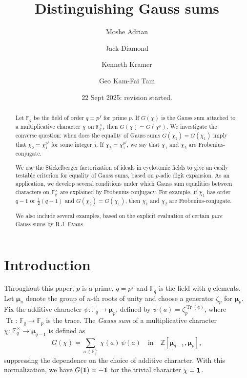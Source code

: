 \documentclass[12pt]{amsart}  \usepackage{amsmath,amssymb,enumerate,amscd,tikz,url}
\title{Distinguishing Gauss sums}
\author[M. Adrian]{Moshe Adrian}
\author[J. Diamond]{Jack Diamond}
\author[K. Kramer]{Kenneth Kramer}
\author[G. K.-F. Tam]{Geo Kam-Fai Tam}
\date{22 Sept 2025:  revision started.}
\numberwithin{equation}{section}
\theoremstyle{definition}
\newcommand{\F}{{\mathbb F}}
\newcommand{\Z}{{\mathbb Z}}
\newcommand{\Mu}{\boldsymbol \mu}
\newcommand{\Tr}{\operatorname{Tr}}
\begin{document}
\baselineskip=17pt

\begin{abstract}
Let $\F_q$ be the field of order $q = p^f$ for prime $p$. If $G(\chi)$ is the Gauss sum attached to a multiplicative character $\chi$ on $\F_q^\times$, then $G(\chi) = G(\chi^p)$.  We investigate the converse question:  when does the equality of Gauss sums $G(\chi_2) = G(\chi_1)$ imply that $\chi_2 = \chi_1^{p^j}$ for some integer $j$.  If $\chi_2 = \chi_1^{p^j}$, we say that $\chi_1$ and $\chi_2$ are Frobenius-conjugate.

We use the Stickelberger factorization of ideals in cyclotomic fields to give an easily testable criterion for equality of Gauss sums, based on $p$-adic digit expansion.  As an application, we develop several conditions under which Gauss sum equalities between characters on $\F_q^\times$ are explained by Frobenius-conjugacy.  For example, if $\chi_1$ has order $q-1$ or $\frac{1}{2}(q-1)$ and $G(\chi_2) = G(\chi_1)$, then $\chi_1$ and $\chi_2$ are Frobenius-conjugate.

We also include several examples, based on the explicit evaluation of certain {\em pure} Gauss sums by R.J. Evans.
\end{abstract}

\maketitle
\tableofcontents


\keywords{}


\section{Introduction}

Throughout this paper, $p$ is a prime, $q = p^f$ and $\mathbb{F}_q$ is the field with $q$ elements.   Let $\Mu_n$ denote the group of $n$-th roots of unity and choose a generator $\zeta_p$ for $\Mu_p$. Fix the additive character $\psi\!: \F_q \to \Mu_p$, defined by $\psi(a) = \zeta_p^{\Tr(a)}$, where $\Tr\!: \, \F_q \to \F_p$ is the trace.  The {\em Gauss sum} of a multiplicative character  $\chi\!: \, \F_q^\times \to \Mu_{q-1}$ is defined as
$$
G(\chi) = \sum_{a \in \F_q^\times} \, \chi(a) \, \psi(a) \quad \text{in} \quad \Z[\Mu_{q-1},\Mu_p],
$$
suppressing the dependence on the choice of additive character.  With this normalization, we have $G(\bf 1) = -1$ for the trivial character $\chi = {\bf 1}$.  
\end{document}
